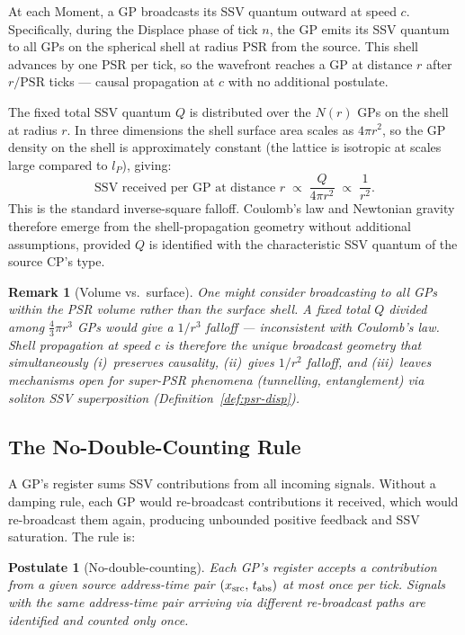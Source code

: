 \documentclass[12pt]{article}
\newtheorem{postulate}[theorem]{Postulate}
\newtheorem{remark}[theorem]{Remark}
\begin{document}
At each Moment, a GP broadcasts its SSV quantum outward at speed $c$.
Specifically, during the Displace phase of tick $n$, the GP emits its SSV
quantum to all GPs on the spherical shell at radius $\text{PSR}$ from the
source.  This shell advances by one PSR per tick, so the wavefront reaches
a GP at distance $r$ after $r/\text{PSR}$ ticks --- causal propagation at
$c$ with no additional postulate.

The fixed total SSV quantum $Q$ is distributed over the $N(r)$ GPs on the
shell at radius $r$.  In three dimensions the shell surface area scales as
$4\pi r^2$, so the GP density on the shell is approximately constant (the
lattice is isotropic at scales large compared to $l_P$), giving:
\begin{equation}
  \text{SSV received per GP at distance }r
  \;\propto\; \frac{Q}{4\pi r^2}
  \;\propto\; \frac{1}{r^2}.
  \label{eq:invsq}
\end{equation}
This is the standard inverse-square falloff.  Coulomb's law and Newtonian
gravity therefore emerge from the shell-propagation geometry without
additional assumptions, provided $Q$ is identified with the characteristic
SSV quantum of the source CP's type.

\begin{remark}[Volume vs.\ surface]
One might consider broadcasting to all GPs within the PSR \emph{volume}
rather than the surface shell.  A fixed total $Q$ divided among
$\tfrac{4}{3}\pi r^3$ GPs would give a $1/r^3$ falloff --- inconsistent
with Coulomb's law.  Shell propagation at speed $c$ is therefore the unique
broadcast geometry that simultaneously (i)~preserves causality, (ii)~gives
$1/r^2$ falloff, and (iii)~leaves mechanisms open for super-PSR phenomena
(tunnelling, entanglement) via soliton SSV superposition
(Definition~\ref{def:psr-disp}).
\end{remark}

\subsection{The No-Double-Counting Rule}

A GP's register sums SSV contributions from all incoming signals.  Without a
damping rule, each GP would re-broadcast contributions it received, which
would re-broadcast them again, producing unbounded positive feedback and SSV
saturation.  The rule is:

\begin{postulate}[No-double-counting]
Each GP's register accepts a contribution from a given source address-time
pair $(x_{\rm src},\, t_{\rm abs})$ at most \emph{once} per tick.  Signals
with the same address-time pair arriving via different re-broadcast paths are
identified and counted only once.
\end{postulate}
\end{document}
